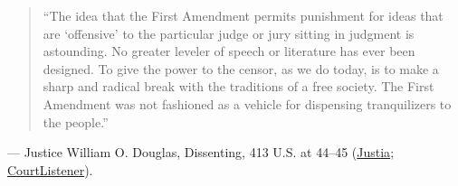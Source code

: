 \documentclass[12pt]{article}
\begin{document}
\begin{quote}
``The idea that the First Amendment permits punishment for ideas that are `offensive' to the particular judge or jury sitting in judgment is astounding. No greater leveler of speech or literature has ever been designed. To give the power to the censor, as we do today, is to make a sharp and radical break with the traditions of a free society. The First Amendment was not fashioned as a vehicle for dispensing tranquilizers to the people.''
\end{quote}
\noindent --- Justice William O. Douglas, Dissenting, 413 U.S. at 44--45 (\href{https://supreme.justia.com/cases/federal/us/413/15/}{Justia}; \href{https://www.courtlistener.com/opinion/108838/miller-v-california/}{CourtListener}).
\end{document}

